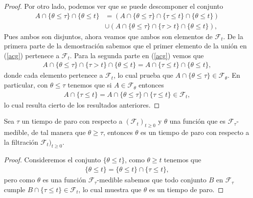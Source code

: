 \begin{proof}
	Por otro lado, podemos ver que se puede descomponer el conjunto
	\begin{align}
		A \cap \{\theta \leq \tau\} \cap \{\theta \leq t\} & = \left( A \cap \{\theta \leq \tau\} \cap \{\tau \leq t\} \cap \{\theta \leq t\} \right) \nonumber \\
		& \cup \left( A \cap \{\theta \leq \tau\} \cap \{\tau > t\} \cap \{\theta \leq t\} \right), \label{acg}
	\end{align}
Pues ambos son disjuntos, ahora veamos que ambos son elementos de $\mathcal{F}_t$. De la primera parte de la demostración sabemos que el primer elemento de la unión en (\ref{acg}) pertenece a $\mathcal{F}_t$. Para la segunda parte en (\ref{acg}) vemos que
	\begin{align*}
		A \cap \{\theta \leq \tau\} \cap \{\tau > t\} \cap \{\theta \leq t\} = A \cap \{\tau \leq t\} \cap \{\theta \leq t\},
	\end{align*}
	donde cada elemento pertenece a $\mathcal{F}_t$, lo cual prueba que $A \cap \{\theta \leq \tau\} \in \mathcal{F}_{\theta}$. En particular, con $\theta \leq \tau$ tenemos que si $A \in \mathcal{F}_{\theta}$ entonces
	\begin{align*}
		A \cap \{ \tau \leq t \} = A \cap \{ \theta \leq \tau \} \cap \{ \tau \leq t \} \in \mathcal{F}_t,
	\end{align*}
	lo cual resulta cierto de los resultados anteriores.
\end{proof}

\begin{lemma}
	\label{nosequeponer}
	Sea $\tau$ un tiempo de paro con respecto a $(\mathcal{F}_t)_{t \geq 0}$ y $\theta$ una función que es $\mathcal{F}_{\tau}$-medible, de tal manera que $\theta \geq \tau$, entonces $\theta$ es un tiempo de paro con respecto a la filtración $\mathcal{F}_t)_{t \geq 0}$.
\end{lemma}
\begin{proof}
	Consideremos el conjunto $\{ \theta \leq t \}$, como $\theta \geq t$ tenemos que
	\begin{align*}
		\{\theta \leq t\} = \{\theta \leq t\} \cap \{\tau \leq t\},
	\end{align*}
	pero como $\theta$ es una función $\mathcal{F}_{\tau}$-medible sabemos que todo conjunto $B$ en $\mathcal{F}_{\tau}$ cumple $B \cap \{\tau \leq t\} \in \mathcal{F}_t$, lo cual muestra que $\theta$ es un tiempo de paro.
\end{proof}

